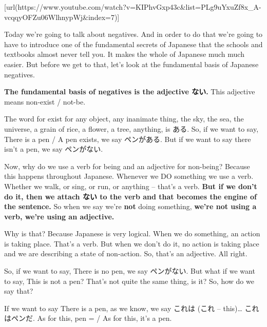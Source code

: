 \startsectionlevel[title={{\bf 7. Negative Forms and Adjectives in Past Tense}},reference={negative-forms-and-adjectives-in-past-tense}]

[url(https://www.youtube.com/watch?v=KIPhvGxp43c&list=PLg9uYxuZf8x_A-vcqqyOFZu06WlhnypWj&index=7)]

Today we're going to talk about negatives. And in order to do that we're going to have to introduce one of the fundamental secrets of Japanese that the schools and textbooks almost never tell you. It makes the whole of Japanese much much easier. But before we get to that, let's look at the fundamental basis of Japanese negatives.

\startsectionlevel[title={The adjective ない},reference={the-adjective-ない}]

{\bf The fundamental basis of negatives is the adjective ない.} This adjective means non-exist / not-be.

{}

The word for exist for any object, any inanimate thing, the sky, the sea, the universe, a grain of rice, a flower, a tree, anything, is ある. So, if we want to say, There is a pen / A pen exists, we say ペンがある. But if we want to say there isn't a pen, we say ペンがない.

{}

Now, why do we use a verb for being and an adjective for non-being? Because this happens throughout Japanese. Whenever we DO something we use a verb. Whether we walk, or sing, or run, or anything -- that's a verb. {\bf But if we don't do it, then we attach ない to the verb and that becomes the engine of the sentence.} So when we say we're {\bf not} doing something, {\bf we're not using a verb, we're using an adjective.}

Why is that? Because Japanese is very logical. When we do something, an action is taking place. That's a verb. But when we don't do it, no action is taking place and we are describing a state of non-action. So, that's an adjective. All right.

So, if we want to say, There is no pen, we say ペンがない. But what if we want to say, This is not a pen? That's not quite the same thing, is it? So, how do we say that?

If we want to say There is a pen, as we know, we say これは (これ -- this)\ldots{} これはペンだ. As for this, pen = / As for this, it's a pen.

